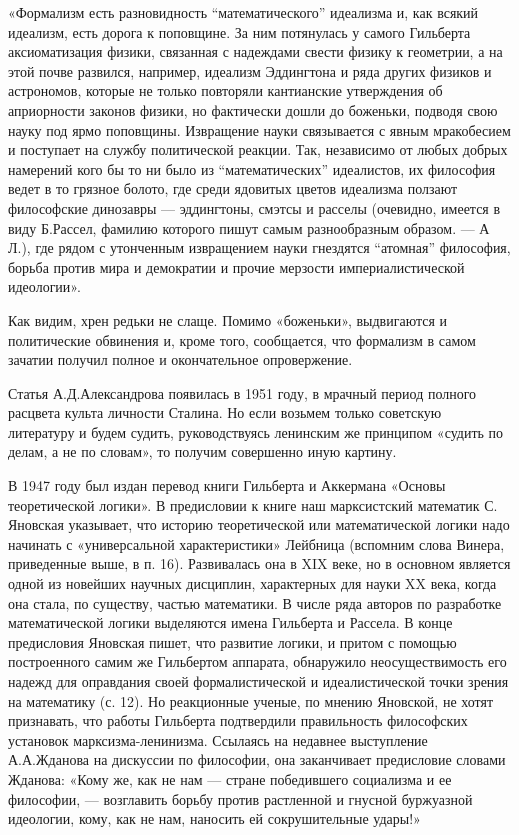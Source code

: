 «Формализм есть разновидность ``математического'' идеализма и, как
всякий идеализм, есть дорога к поповщине. За ним потянулась у самого
Гильберта аксиоматизация физики, связанная с надеждами свести физику к
геометрии, а на этой почве развился, например, идеализм Эддингтона и
ряда других физиков и астрономов, которые не только повторяли
кантианские утверждения об априорности законов физики, но фактически
дошли до боженьки, подводя свою науку под ярмо поповщины. Извращение
науки связывается с явным мракобесием и поступает на службу
политической реакции. Так, независимо от любых добрых намерений кого
бы то ни было из ``математических'' идеалистов, их философия ведет в
то грязное болото, где среди ядовитых цветов идеализма ползают
философские динозавры --- эддингтоны, смэтсы и расселы (очевидно,
имеется в виду Б.Рассел, фамилию которого пишут самым разнообразным
образом. --- А Л.), где рядом с утонченным извращением науки гнездятся
``атомная'' философия, борьба против мира и демократии и прочие
мерзости империалистической идеологии».

Как видим, хрен редьки не слаще. Помимо «боженьки», выдвигаются и
политические обвинения и, кроме того, сообщается, что формализм в
самом зачатии получил полное и окончательное опровержение.

Статья А.Д.Александрова появилась в 1951 году, в мрачный период полного
расцвета культа личности Сталина. Но если возьмем только советскую
литературу и будем судить, руководствуясь ленинским же принципом
«судить по делам, а не по словам», то получим совершенно иную картину.

В 1947 году был издан перевод книги Гильберта и Аккермана «Основы
теоретической логики». В предисловии к книге наш марксистский
математик С. Яновская указывает, что историю теоретической или
математической логики надо начинать с «универсальной характеристики»
Лейбница (вспомним слова Винера, приведенные выше, в п. 16).
Развивалась она в XIX веке, но в основном является одной из новейших
научных дисциплин, характерных для науки XX века, когда она стала, по
существу, частью математики. В числе ряда авторов по разработке
математической логики выделяются имена Гильберта и Рассела. В конце
предисловия Яновская пишет, что развитие логики, и притом с помощью
построенного самим же Гильбертом аппарата, обнаружило неосуществимость
его надежд для оправдания своей формалистической и идеалистической
точки зрения на математику (с. 12). Но реакционные ученые, по мнению
Яновской, не хотят признавать, что работы Гильберта подтвердили
правильность философских установок марксизма-ленинизма. Ссылаясь на
недавнее выступление А.А.Жданова на дискуссии по философии, она
заканчивает предисловие словами Жданова: «Кому же, как не нам ---
стране победившего социализма и ее философии, --- возглавить борьбу
против растленной и гнусной буржуазной идеологии, кому, как не нам,
наносить ей сокрушительные удары!»

